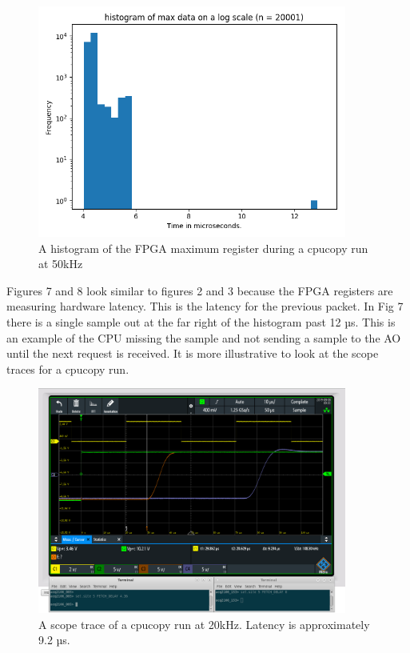 \documentclass{article}
\begin{document}
\begin{figure}
	\centering
	\includegraphics[width=4.0in]{images/cpu_copy_50kHz.png}
	\caption{A histogram of the FPGA maximum register during a cpucopy run at 50kHz}
	\label{}
\end{figure}

Figures 7 and 8 look similar to figures 2 and 3 because the FPGA registers are measuring hardware latency.
This is the latency for the previous packet.
In Fig 7 there is a single sample out at the far right of the histogram past 12 µs.
This is an example of the CPU missing the sample and not sending a sample to the AO until the next request is received.
It is more illustrative to look at the scope traces for a cpucopy run.


\begin{figure}
	\centering
	\includegraphics[width=4.0in]{images/20kHz_annotated_scope_cpucopy.png}
	\caption{A scope trace of a cpucopy run at 20kHz. Latency is approximately 9.2 µs.}
	\label{}
\end{figure}
\end{document}
